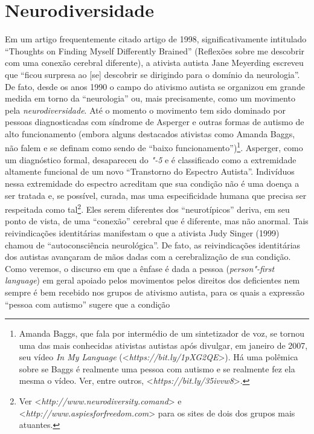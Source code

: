 \chapter{Neurodiversidade}

Em um artigo frequentemente citado artigo de 1998, significativamente
intitulado ``Thoughts on Finding Myself Differently Brained'' (Reflexões
sobre me descobrir com uma conexão cerebral diferente), a ativista
autista Jane Meyerding escreveu que ``ficou surpresa ao {[}se{]}
descobrir se dirigindo para o domínio da neurologia''. De fato, desde os
anos 1990 o campo do ativismo autista se organizou em grande medida em
torno da ``neurologia'' ou, mais precisamente, como um movimento pela
\emph{neurodiversidade}. Até o momento o movimento tem sido dominado por
pessoas diagnosticadas com síndrome de Asperger e outras formas de
autismo de alto funcionamento (embora alguns destacados ativistas como
Amanda Baggs, não falem e se definam como sendo de ``baixo
funcionamento'')\footnote[7]{Amanda Baggs, que fala por intermédio de um sintetizador de voz, se
tornou uma das mais conhecidas ativistas autistas após divulgar, em
janeiro de 2007, seu vídeo \emph{In My Language}
(\textless{}\emph{https://bit.ly/1pXG2QE}\textgreater{}). Há uma polêmica
sobre se Baggs é realmente uma pessoa com autismo e se realmente fez ela
mesma o vídeo. Ver, entre outros,
\textless{}\emph{https://bit.ly/35ivvw8}\textgreater{}.}. Asperger, como um diagnóstico
formal, desapareceu do \emph{"-5} e é classificado como a extremidade
altamente funcional de um novo ``Transtorno do Espectro Autista''.
Indivíduos nessa extremidade do espectro acreditam que sua condição não
é uma doença a ser tratada e, se possível, curada, mas uma
especificidade humana que precisa ser respeitada como
tal\footnote[8]{Ver \textless{}\emph{http://www.neurodiversity.comand}\textgreater{} e
\textless{}\emph{http://www.aspiesforfreedom.com}\textgreater{} para os sites de dois dos grupos
mais atuantes.}. Eles serem diferentes dos ``neurotípicos''
deriva, em seu ponto de vista, de uma ``conexão'' cerebral que é
diferente, mas não anormal. Tais reivindicações identitárias manifestam
o que a ativista Judy Singer (1999) chamou de ``autoconsciência
neurológica''. De fato, as reivindicações identitárias dos autistas
avançaram de mãos dadas com a cerebralização de sua condição. Como
veremos, o discurso em que a ênfase é dada a pessoa (\emph{person"-first
language}) em geral apoiado pelos movimentos pelos direitos dos
deficientes nem sempre é bem recebido nos grupos de ativismo autista,
para os quais a expressão ``pessoa com autismo'' sugere que a condição
